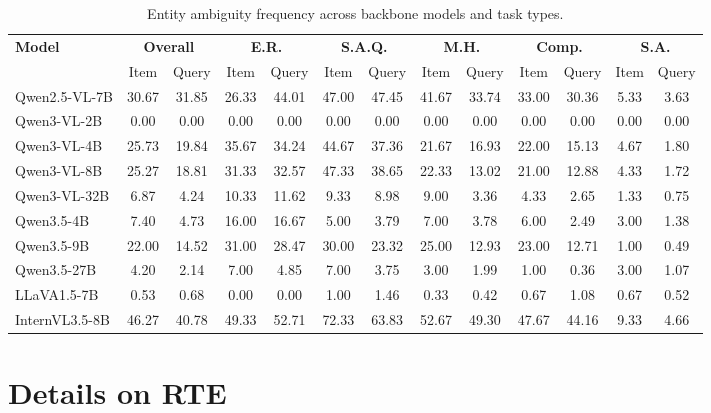 \documentclass{article} %
\begin{document}
\begin{table}[htbp]
\centering
\setlength{\tabcolsep}{3pt}
\caption{Entity ambiguity frequency across backbone models and task types.}
\begin{tabular}{l c c c c c c c c c c c c}
\toprule
\multirow{2}{*}{\textbf{Model}} & 
\multicolumn{2}{c}{\textbf{Overall}} &
\multicolumn{2}{c}{\textbf{E.R.}} &
\multicolumn{2}{c}{\textbf{S.A.Q.}} &
\multicolumn{2}{c}{\textbf{M.H.}} &
\multicolumn{2}{c}{\textbf{Comp.}} &
\multicolumn{2}{c}{\textbf{S.A.}} \\
\cmidrule(lr){2-3} \cmidrule(lr){4-5} \cmidrule(lr){6-7} \cmidrule(lr){8-9} \cmidrule(lr){10-11} \cmidrule(lr){12-13}
 & Item  & Query  & Item  & Query  & Item  & Query  & Item  & Query  & Item  & Query  & Item  & Query  \\
\midrule
Qwen2.5-VL-7B & 30.67 & 31.85 & 26.33 & 44.01 & 47.00 & 47.45 & 41.67 & 33.74 & 33.00 & 30.36 & 5.33 & 3.63 \\
Qwen3-VL-2B & 0.00 & 0.00 & 0.00 & 0.00 & 0.00 & 0.00 & 0.00 & 0.00 & 0.00 & 0.00 & 0.00 & 0.00 \\
Qwen3-VL-4B & 25.73 & 19.84 & 35.67 & 34.24 & 44.67 & 37.36 & 21.67 & 16.93 & 22.00 & 15.13 & 4.67 & 1.80 \\
Qwen3-VL-8B & 25.27 & 18.81 & 31.33 & 32.57 & 47.33 & 38.65 & 22.33 & 13.02 & 21.00 & 12.88 & 4.33 & 1.72 \\
Qwen3-VL-32B & 6.87 & 4.24 & 10.33 & 11.62 & 9.33 & 8.98 & 9.00 & 3.36 & 4.33 & 2.65 & 1.33 & 0.75 \\
Qwen3.5-4B & 7.40 & 4.73 & 16.00 & 16.67 & 5.00 & 3.79 & 7.00 & 3.78 & 6.00 & 2.49 & 3.00 & 1.38 \\
Qwen3.5-9B & 22.00 & 14.52 & 31.00 & 28.47 & 30.00 & 23.32 & 25.00 & 12.93 & 23.00 & 12.71 & 1.00 & 0.49 \\
Qwen3.5-27B & 4.20 & 2.14 & 7.00 & 4.85 & 7.00 & 3.75 & 3.00 & 1.99 & 1.00 & 0.36 & 3.00 & 1.07 \\
LLaVA1.5-7B & 0.53 & 0.68 & 0.00 & 0.00 & 1.00 & 1.46 & 0.33 & 0.42 & 0.67 & 1.08 & 0.67 & 0.52 \\
InternVL3.5-8B & 46.27 & 40.78 & 49.33 & 52.71 & 72.33 & 63.83 & 52.67 & 49.30 & 47.67 & 44.16 & 9.33 & 4.66 \\
\bottomrule
\end{tabular}
\label{tab:ambiguity_frequency_task_type}
\end{table}

\section{Details on RTE}
\end{document}
